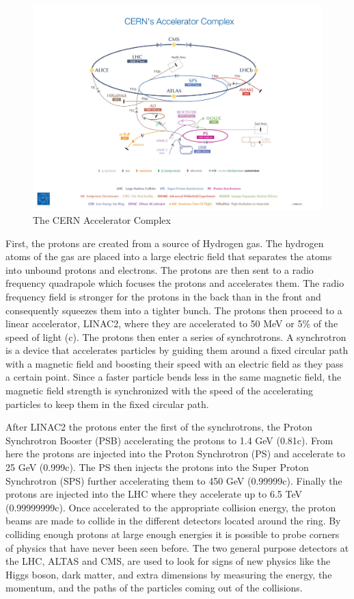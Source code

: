 \begin{figure}[h!]
  \centering
  \includegraphics[width=6in]{images/cern_accel_complex.png}
  \caption
   {The CERN Accelerator Complex \cite{cernaccelcomplex}}
  \label{fig:cernaccel}
\end{figure}

First, the protons are created from a source of Hydrogen gas. The hydrogen atoms of the gas are placed into a large electric field that separates the atoms into unbound protons and electrons. The protons are then sent to a radio frequency quadrapole which focuses the protons and accelerates them. The radio frequency field is stronger for the protons in the back than in the front and consequently squeezes them into a tighter bunch. The protons then proceed to a linear accelerator, LINAC2, where they are accelerated to 50 MeV or 5\% of the speed of light (c). The protons then enter a series of synchrotrons. A synchrotron is a device that accelerates particles by guiding them around a fixed circular path with a magnetic field and boosting their speed with an electric field as they pass a certain point. Since a faster particle bends less in the same magnetic field, the magnetic field strength is synchronized with the speed of the accelerating particles to keep them in the fixed circular path. 

After LINAC2 the protons enter the first of the synchrotrons, the Proton Synchrotron Booster (PSB) accelerating the protons to 1.4 GeV (0.81c). From here the protons are injected into the Proton Synchrotron (PS) and accelerate to 25 GeV (0.999c). The PS then injects the protons into the Super Proton Synchrotron (SPS) further accelerating them to 450 GeV (0.99999c). Finally the protons are injected into the LHC where they accelerate up to 6.5 TeV (0.99999999c). Once accelerated to the appropriate collision energy, the proton beams are made to collide in the different detectors located around the ring. By colliding enough protons at large enough energies it is possible to probe corners of physics that have never been seen before. The two general purpose detectors at the LHC, ALTAS and CMS, are used to look for signs of new physics like the Higgs boson, dark matter, and extra dimensions by measuring the energy, the momentum, and the paths of the particles coming out of the collisions.

